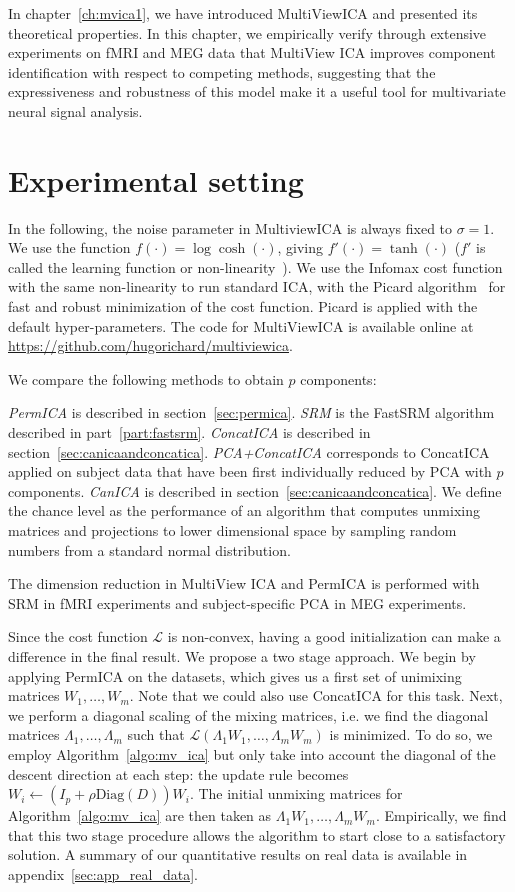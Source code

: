 In chapter~\ref{ch:mvica1}, we have introduced MultiViewICA and presented its
theoretical properties.
In this chapter, we empirically verify through extensive experiments on fMRI and
MEG data that MultiView ICA improves component identification with respect to competing methods, suggesting that the expressiveness and robustness of this model make it a useful tool for multivariate neural signal analysis.

\section{Experimental setting}
\label{sec:expts}
In the following, the noise parameter in MultiviewICA is always fixed to $\sigma =1$.
We use the function $f(\cdot)= \log\cosh(\cdot)$, giving $f'(\cdot) =
\tanh(\cdot)$ ($f'$ is called the learning function or non-linearity~\cite{hyvarinen1998independent}).
We use the Infomax cost function~\cite{bell1995information} with the same non-linearity to run standard ICA, with the Picard algorithm~\cite{ablin2018faster} for fast and robust minimization of the cost function. Picard is applied with the default hyper-parameters.
The code for MultiViewICA is available online at \url{https://github.com/hugorichard/multiviewica}.
%

We compare the following methods to obtain $p$ components:

\emph{PermICA} is described in section~\ref{sec:permica}.
%
\emph{SRM} is the FastSRM algorithm described in part~\ref{part:fastsrm}.
%
\emph{ConcatICA} is described in section~\ref{sec:canicaandconcatica}.
%
\emph{PCA+ConcatICA} corresponds to ConcatICA applied on subject data that have been first individually reduced by PCA with $p$ components. 
%
\emph{CanICA} is described in section~\ref{sec:canicaandconcatica}.
We define the chance level as the performance of an algorithm that computes unmixing matrices and projections to lower dimensional space by sampling random numbers from a standard normal distribution. 
% 


The dimension reduction in MultiView ICA and PermICA is performed with SRM in
fMRI experiments and subject-specific PCA in MEG experiments.

Since the cost function $\mathcal{L}$ is non-convex, having a good initialization can make a difference in the final result. We propose a two stage approach.
We begin by applying PermICA on the datasets, which gives us a first set of unimixing matrices $W_1, \dots, W_m$.
Note that we could also use ConcatICA for this task.
Next, we perform a diagonal scaling of the mixing matrices, i.e. we find the diagonal matrices $\Lambda_1, \dots, \Lambda_m$ such that $\mathcal{L}(\Lambda_1W_1, \dots, \Lambda_mW_m)$ is minimized.
To do so, we employ Algorithm~\ref{algo:mv_ica} but only take into account the diagonal of the descent direction at each step: the update rule becomes $W_i \leftarrow (I_p + \rho \text{Diag}(D))W_i$.
The initial unmixing matrices for Algorithm~\ref{algo:mv_ica} are then taken as $\Lambda_1W_1, \dots, \Lambda_mW_m$.
Empirically, we find that this two stage procedure allows the algorithm to start close to a satisfactory solution.
A summary of our quantitative results on real data is available in appendix~\ref{sec:app_real_data}.



